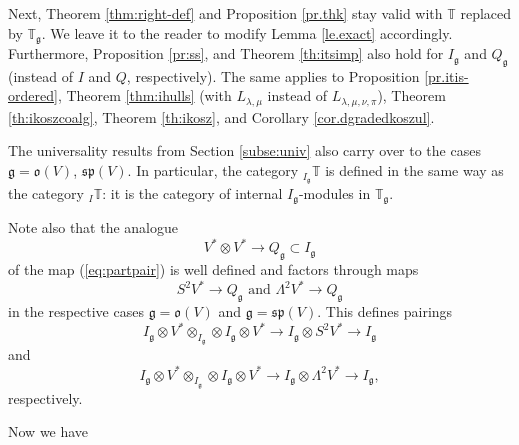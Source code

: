 \documentclass[11pt]{article}
\theoremstyle{plain}
\theoremstyle{nonumberplain}
\theoremstyle{plain}
\numberwithin{equation}{section}
\theoremstyle{nonumberplain}
\newcommand\bT{{\mathbb T}}
\newcommand\fg{{\mathfrak g}}
\newcommand\fo{{\mathfrak o}}
\newcommand\fp{{\mathfrak p}}
\newcommand\fs{{\mathfrak s}}
\newcommand\1{{\bf 1}}
\begin{document}
Next, Theorem \ref{thm:right-def} and Proposition \ref{pr.thk} stay valid with $\bT$ replaced by $\bT_{\fg}$. We leave it to the reader to modify Lemma \ref{le.exact} accordingly. Furthermore, Proposition \ref{pr:ss}, and Theorem \ref{th:itsimp} also hold for $I_{\fg}$ and $Q_{\fg}$ (instead of $I$ and $Q$, respectively). The same applies to Proposition \ref{pr.itis-ordered}, Theorem \ref{thm:ihulls} (with $L_{\lambda,\mu}$ instead of $L_{\lambda,\mu,\nu,\pi}$), Theorem \ref{th:ikoszcoalg}, Theorem \ref{th:ikosz}, and Corollary \ref{cor.dgradedkoszul}.

The universality results from Section \ref{subse:univ} also carry over to the cases $\fg=\fo(V)$, $\fs\fp(V)$. In particular, the category ${}_{I_{\fg}}\bT$ is defined in the same way as the category ${}_{I}\bT$: it is the category of internal $I_{\fg}$-modules in $\bT_{\fg}$. 

Note also that the analogue \begin{equation*}
V^*\otimes V^* \rightarrow Q_{\fg}\subset I_{\fg}
\end{equation*}
of the map (\ref{eq:partpair}) is well defined and factors through maps \begin{equation*}
S^2V^*\rightarrow Q_{\fg}\text{ and } \Lambda^2V^*\rightarrow Q_{\fg}
\end{equation*}
in the respective cases $\fg=\fo(V)$ and $\fg=\fs\fp(V)$. This defines pairings \begin{equation}\label{eq:igsv}
I_{\fg}\otimes V^* \otimes_{I_{\fg}} \otimes I_{\fg} \otimes V^* \rightarrow I_{\fg} \otimes S^2V^* \rightarrow I_{\fg} 
\end{equation}
and
\begin{equation}\label{eq:iglambdav}
I_{\fg}\otimes V^* \otimes_{I_{\fg}} \otimes I_{\fg} \otimes V^* \rightarrow I_{\fg} \otimes \Lambda^2V^* \rightarrow I_{\fg},
\end{equation}
respectively. 

Now we have 
\end{document}
